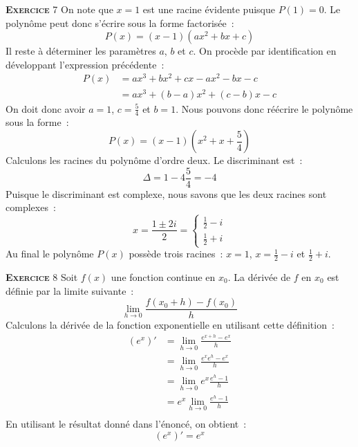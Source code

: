 \documentclass[10pt,a4paper,notitlepage]{article}
\newcommand{\exercice}[1]{\textsc{\textbf{Exercice}} #1}
\begin{document}
\bigskip

\exercice{7} On note que $x=1$ est une racine évidente puisque $P(1)=0$. Le polynôme peut donc s'écrire sous la forme factorisée :
\[
P(x) = (x-1)(ax^2+bx+c)
\]
Il reste à déterminer les paramètres $a$, $b$ et $c$. On procède par identification en développant l'expression précédente :
\[
  \begin{split}
    P(x) &= ax^3+bx^2+cx-ax^2-bx-c\\
    &= ax^3 +(b-a)x^2+(c-b)x-c
  \end{split}
\]
On doit donc avoir $a=1$, $c=\frac{5}{4}$ et $b=1$. Nous pouvons donc réécrire le polynôme sous la forme :
\[
P(x) = (x-1)(x^2+x+\frac{5}{4})
\]
Calculons les racines du polynôme d'ordre deux. Le discriminant est :
\[
\Delta = 1-4\frac{5}{4}=-4
\]
Puisque le discriminant est complexe, nous savons que les deux racines sont complexes :
\[
  x = \frac{1\pm 2i}{2} =
  \begin{cases}
    \frac{1}{2}-i\\
    \frac{1}{2}+i
  \end{cases}
\]
Au final le polynôme $P(x)$ possède trois racines : $x=1$, $x=\frac{1}{2}-i$ et $\frac{1}{2}+i$.

\bigskip

\exercice{8} Soit $f(x)$ une fonction continue en $x_0$. La dérivée de $f$ en $x_0$ est définie par la limite suivante :
\[
\lim_{h\rightarrow 0}\frac{f(x_0+h)-f(x_0)}{h}
\]
Calculons la dérivée de la fonction exponentielle en utilisant cette définition :
\[
  \begin{split}
    \left(e^x\right)' &= \lim_{h \rightarrow 0}\frac{e^{x+h}-e^x}{h}\\
    &= \lim_{h \rightarrow 0}\frac{e^xe^h-e^x}{h}\\
    &= \lim_{h \rightarrow 0}e^x\frac{e^h-1}{h}\\
    &= e^x\lim_{h \rightarrow 0}\frac{e^h-1}{h}\\
  \end{split}
\]
En utilisant le résultat donné dans l'énoncé, on obtient :
\[
\left(e^x\right)' = e^x
\]
\end{document}
